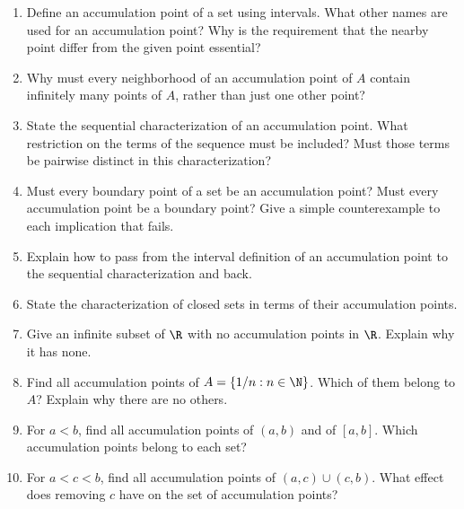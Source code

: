 \begin{enumerate}[resume]
  \item Define an accumulation point of a set using intervals.
    What other names are used for an accumulation point?
    Why is the requirement that the nearby point differ from the given
    point essential?

  \item Why must every neighborhood of an accumulation point of \(A\)
    contain infinitely many points of \(A\), rather than just one other point?

  \item State the sequential characterization of an accumulation point.
    What restriction on the terms of the sequence must be included?
    Must those terms be pairwise distinct in this characterization?

  \item Must every boundary point of a set be an accumulation point?
    Must every accumulation point be a boundary point?
    Give a simple counterexample to each implication that fails.

  \item Explain how to pass from the interval definition of an
    accumulation point to the sequential characterization and back.

  \item State the characterization of closed sets in terms of their
    accumulation points.

  \item Give an infinite subset of \(\R\) with no accumulation points
    in \(\R\). Explain why it has none.

  \item Find all accumulation points of \(A=\{1/n:n\in\N\}\).
    Which of them belong to \(A\)? Explain why there are no others.

  \item For \(a<b\), find all accumulation points of \((a,b)\)
    and of \([a,b]\). Which accumulation points belong to each set?

  \item For \(a<c<b\), find all accumulation points of
    \((a,c)\cup(c,b)\). What effect does removing \(c\) have on the
    set of accumulation points?


\end{enumerate}
